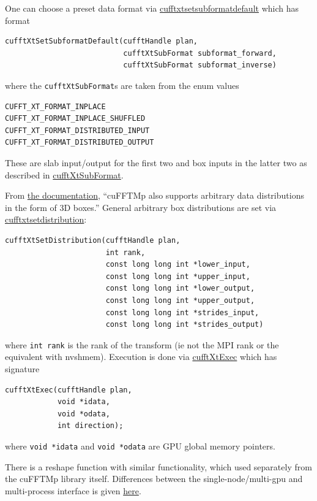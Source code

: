 \documentclass[12pt]{article}
\renewcommand{\(}{\left(}
\renewcommand{\)}{\right)}
\begin{document}
One can choose a preset data format via
\href{https://docs.nvidia.com/hpc-sdk/cufftmp/api/index.html#cufftxtsetsubformatdefault}{cufftxtsetsubformatdefault} which has format
\begin{lstlisting}
cufftXtSetSubformatDefault(cufftHandle plan,
                           cufftXtSubFormat subformat_forward,
                           cufftXtSubFormat subformat_inverse)
\end{lstlisting}
where the \lstinline{cufftXtSubFormat}s are taken from the enum values
\begin{lstlisting}
CUFFT_XT_FORMAT_INPLACE
CUFFT_XT_FORMAT_INPLACE_SHUFFLED
CUFFT_XT_FORMAT_DISTRIBUTED_INPUT
CUFFT_XT_FORMAT_DISTRIBUTED_OUTPUT
\end{lstlisting}
These are slab input/output for the first two and box inputs in the
latter two as described in
\href{https://docs.nvidia.com/hpc-sdk/cufftmp/api/index.html#c.cufftXtSubFormat}{cufftXtSubFormat}.

From
\href{https://docs.nvidia.com/hpc-sdk/cufftmp/usage/api_usage.html#usage-with-custom-slabs-and-pencils-data-decompositions}{the
  documentation}, ``cuFFTMp also supports arbitrary data distributions
in the form of 3D boxes.''  General arbitrary box distributions are
set via
\href{https://docs.nvidia.com/hpc-sdk/cufftmp/api/index.html#cufftxtsetdistribution}{cufftxtsetdistribution}:
\begin{lstlisting}
cufftXtSetDistribution(cufftHandle plan,
                       int rank,
                       const long long int *lower_input,
                       const long long int *upper_input,
                       const long long int *lower_output,
                       const long long int *upper_output,
                       const long long int *strides_input,
                       const long long int *strides_output)
\end{lstlisting}
where \lstinline{int rank} is the rank of the transform (ie not the
MPI rank or the equivalent with nvshmem).  Execution is done via
\href{https://docs.nvidia.com/hpc-sdk/cufftmp/api/index.html#c.cufftXtExec}{cufftXtExec}
which has signature
\begin{lstlisting}
cufftXtExec(cufftHandle plan,
            void *idata,
            void *odata,
            int direction);
\end{lstlisting}
where \lstinline{void *idata} and \lstinline{void *odata} are GPU
global memory pointers.

There is a reshape function with similar functionality, which used
separately from the cuFFTMp library itself.  Differences between the
single-node/multi-gpu and multi-process interface is given
\href{https://docs.nvidia.com/hpc-sdk/cufftmp/usage/differences.html}{here}.
\end{document}
